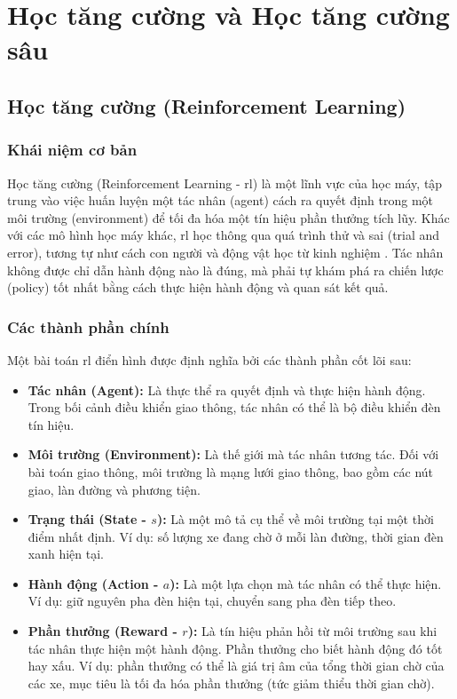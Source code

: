 \section{Học tăng cường và Học tăng cường sâu}
\subsection{Học tăng cường (Reinforcement Learning)}
\subsubsection{Khái niệm cơ bản}
Học tăng cường (Reinforcement Learning - \ac{rl}) là một lĩnh vực của học máy, tập
trung vào việc huấn luyện một tác nhân (agent) cách ra quyết định trong một môi trường
(environment) để tối đa hóa một tín hiệu phần thưởng tích lũy. Khác với các mô
hình học máy khác, \ac{rl} học thông qua quá trình thử và sai (trial and error),
tương tự như cách con người và động vật học từ kinh nghiệm \cite{Sutton2018}.
Tác nhân không được chỉ dẫn hành động nào là đúng, mà phải tự khám phá ra chiến lược
(policy) tốt nhất bằng cách thực hiện hành động và quan sát kết quả.

\subsubsection{Các thành phần chính}
Một bài toán \ac{rl} điển hình được định nghĩa bởi các thành phần cốt lõi sau:
\begin{itemize}
    \item \textbf{Tác nhân (Agent):} Là thực thể ra quyết định và thực hiện hành
        động. Trong bối cảnh điều khiển giao thông, tác nhân có thể là bộ điều
        khiển đèn tín hiệu.

    \item \textbf{Môi trường (Environment):} Là thế giới mà tác nhân tương tác. Đối
        với bài toán giao thông, môi trường là mạng lưới giao thông, bao gồm các
        nút giao, làn đường và phương tiện.

    \item \textbf{Trạng thái (State - $s$):} Là một mô tả cụ thể về môi trường
        tại một thời điểm nhất định. Ví dụ: số lượng xe đang chờ ở mỗi làn đường,
        thời gian đèn xanh hiện tại.

    \item \textbf{Hành động (Action - $a$):} Là một lựa chọn mà tác nhân có thể
        thực hiện. Ví dụ: giữ nguyên pha đèn hiện tại, chuyển sang pha đèn tiếp theo.

    \item \textbf{Phần thưởng (Reward - $r$):} Là tín hiệu phản hồi từ môi
        trường sau khi tác nhân thực hiện một hành động. Phần thưởng cho biết hành
        động đó tốt hay xấu. Ví dụ: phần thưởng có thể là giá trị âm của tổng thời
        gian chờ của các xe, mục tiêu là tối đa hóa phần thưởng (tức giảm thiểu thời
        gian chờ).
\end{itemize}

